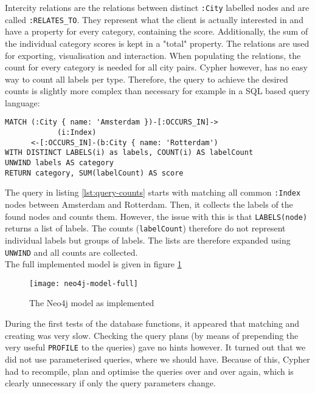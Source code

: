 Intercity relations are the relations between distinct \texttt{:City} labelled nodes and are called \texttt{:RELATES\_TO}. They represent what the client is actually interested in and have a property for every category, containing the score. Additionally, the sum of the individual category scores is kept in a "total" property. The relations are used for exporting, visualisation and interaction. When populating the relations, the count for every category is needed for all city pairs. Cypher however, has no easy way to count all labels per type. Therefore, the query to achieve the desired counts is slightly more complex than necessary for example in a SQL based query language:

\begin{lstlisting}[language=cypher, caption={Counting distinct labels}, label={lst:query-counts}]
MATCH (:City { name: 'Amsterdam })-[:OCCURS_IN]->
            (i:Index)
      <-[:OCCURS_IN]-(b:City { name: 'Rotterdam')
WITH DISTINCT LABELS(i) as labels, COUNT(i) AS labelCount
UNWIND labels AS category
RETURN category, SUM(labelCount) AS score
\end{lstlisting}

The query in listing \ref{lst:query-counts} starts with matching all common \texttt{:Index} nodes between Amsterdam and Rotterdam. Then, it collects the labels of the found nodes and counts them.
However, the issue with this is that \texttt{LABELS(node)} returns a list of labels. The counts (\texttt{labelCount}) therefore do not represent individual labels but groups of labels. The lists are therefore expanded using \texttt{UNWIND} and all counts are collected.\\

The full implemented model is given in figure \ref{fig:neo4j-model-full}

\begin{figure}
    \centering
    \texttt{[image: neo4j-model-full]}
    \caption{The Neo4j model as implemented}
    \label{fig:neo4j-model-full}
\end{figure}

During the first tests of the database functions, it appeared that matching and creating was very slow. Checking the query plans (by means of prepending the very useful \texttt{PROFILE} to the queries) gave no hints however. It turned out that we did not use parameterised queries, where we should have. Because of this, Cypher had to recompile, plan and optimise the queries over and over again, which is clearly unnecessary if only the query parameters change. 
